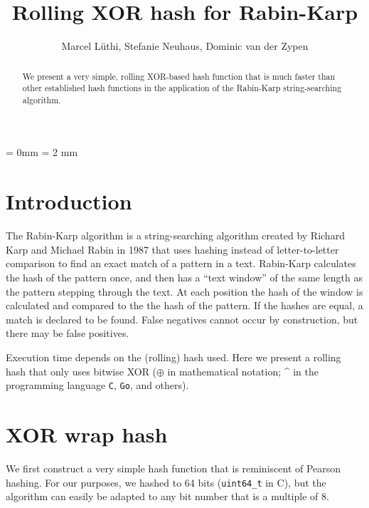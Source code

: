 \documentclass[11pt, a4paper]{amsart}
\begin{document}
\title{Rolling XOR hash for Rabin-Karp}

\author{Marcel L\"uthi, Stefanie Neuhaus, Dominic van der Zypen}


\begin{abstract} We present a very simple, rolling XOR-based 
hash function that is much faster than other established hash functions
in the application of the Rabin-Karp string-searching algorithm.
\end{abstract}

\maketitle
\parindent = 0mm
\parskip = 2 mm
\section{Introduction}
The Rabin-Karp algorithm \cite{RK} is a string-searching algorithm created by 
Richard Karp and Michael Rabin in 1987 that uses hashing instead of letter-to-letter
comparison to find an exact match of a pattern in a text. Rabin-Karp calculates 
the hash of the pattern once, and then has a ``text window'' of the same length as the 
pattern stepping through the text. At each position the hash of the 
window is calculated and compared to the the hash of the pattern. If the
hashes are equal, a match is declared to be found. False negatives cannot 
occur by construction, but there may be false positives.

Execution time depends on the (rolling) hash used. Here we present a 
rolling hash that only uses bitwise XOR ($\oplus$ in mathematical notation;
\string^ in the programming language {\tt C}, {\tt Go}, and others).


\section{XOR wrap hash}
We first construct a very simple  
hash function that is reminiscent of Pearson hashing. For our 
purposes, we hashed to 64 bits ({\tt uint64\_t} in C), but 
the algorithm can easily be adapted to any bit number that 
is a multiple of $8$.
\end{document}
